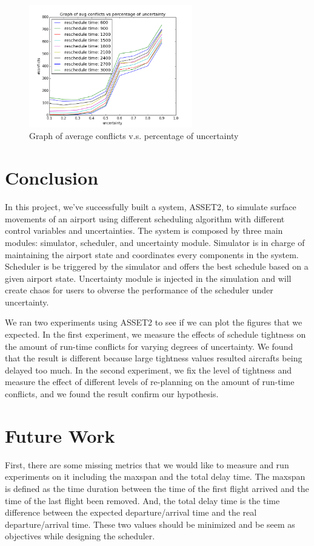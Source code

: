 \documentclass[conference]{IEEEtran}
\begin{document}
\begin{figure}[!t]
\centering
\includegraphics[width=2.8in]{exp2-g2}
\caption{Graph of average conflicts v.s. percentage of uncertainty\label{exp2-g2}}
\end{figure}

\section{Conclusion}

In this project, we've successfully built a system, ASSET2, to simulate surface movements of an airport using different scheduling algorithm with different control variables and uncertainties. The system is composed by three main modules: simulator, scheduler, and uncertainty module. Simulator is in charge of maintaining the airport state and coordinates every components in the system. Scheduler is be triggered by the simulator and offers the best schedule based on a given airport state. Uncertainty module is injected in the simulation and will create chaos for users to obverse the performance of the scheduler under uncertainty.

We ran two experiments using ASSET2 to see if we can plot the figures that we expected. In the first experiment, we measure the effects of schedule tightness on the amount of run-time conflicts for varying degrees of uncertainty. We found that the result is different because large tightness values resulted aircrafts being delayed too much. In the second experiment, we fix the level of tightness and measure the effect of different levels of re-planning on the amount of run-time conflicts, and we found the result confirm our hypothesis.

\section{Future Work}

First, there are some missing metrics that we would like to measure and run experiments on it including the maxspan and the total delay time. The maxspan is defined as the time duration between the time of the first flight arrived and the time of the last flight been removed. And, the total delay time is the time difference between the expected departure/arrival time and the real departure/arrival time. These two values should be minimized and be seem as objectives while designing the scheduler.
\end{document}
